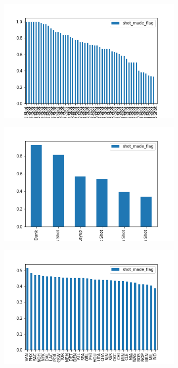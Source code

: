 \documentclass[a4paper,11pt,onecolumn,twoside]{article}
\begin{document}
\begin{figure}[htbp]
	\centering
	\begin{subfigure}[t]{0.30\textwidth}
		\centering
		\includegraphics[width=1.0\textwidth]{action_type.png}
	\end{subfigure}
	\quad
	\begin{subfigure}[t]{0.30\textwidth}
		\centering
		\includegraphics[width=1.0\textwidth]{combined_shot_type.png}
	\end{subfigure}	
	\quad
	\begin{subfigure}[t]{0.30\textwidth}
		\centering
		\includegraphics[width=1.0\textwidth]{opponent.png}

\end{subfigure}
\end{figure}
\end{document}
